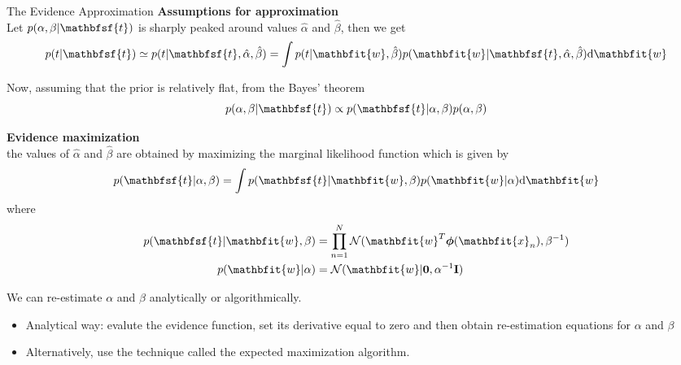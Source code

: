 \documentclass{bredelebeamer}
\begin{document}
\begin{frame}{The Evidence Approximation}
  \textbf{Assumptions for approximation} \\
  Let $p(\alpha, \beta | \mathbfsf{t})$ is sharply peaked around values
  $\hat{\alpha}$ and $\hat{\beta}$, then we get
  \begin{equation}
    p(t|\mathbfsf{t}) \simeq p(t|\mathbfsf{t},\hat{\alpha},\hat{\beta})
    = \int p(t|\mathbfit{w}, \hat{\beta}) p(\mathbfit{w}|\mathbfsf{t},\hat{\alpha},\hat{\beta}) \mathrm{d} \mathbfit{w}
  \end{equation}

  Now, assuming that the prior is relatively flat, from the Bayes' theorem
  \begin{equation}
    p(\alpha, \beta | \mathbfsf{t}) \propto p(\mathbfsf{t}|\alpha,\beta) p (\alpha, \beta)
  \end{equation}

  \textbf{Evidence maximization} \\
  the values of $\hat{\alpha}$ and $\hat{\beta}$ are obtained by maximizing the
  marginal likelihood function which is given by
  \begin{equation}
    p(\mathbfsf{t}|\alpha,\beta) = \int p(\mathbfsf{t}|\mathbfit{w},\beta) p(\mathbfit{w}|\alpha) \mathrm{d}\mathbfit{w}
  \end{equation}
  where
  \begin{equation}
    \begin{split}
      p(\mathbfsf{t}|\mathbfit{w},\beta) &= \prod_{n=1}^{N} \mathcal{N}(\mathbfit{w}^T \boldsymbol{\phi}(\mathbfit{x}_n), \beta^{-1}) \\
      p(\mathbfit{w}|\alpha) &= \mathcal{N}(\mathbfit{w} | \mathbf{0}, \alpha^{-1}\mathbf{I})
    \end{split}
  \end{equation}

  We can re-estimate $\alpha$ and $\beta$ analytically or algorithmically.
  \begin{itemize}
    \item Analytical way: evalute the evidence function, set its derivative equal
          to zero and then obtain re-estimation equations for $\alpha$ and $\beta$
    \item Alternatively, use the technique called the expected maximization
          algorithm.
  \end{itemize}
\end{frame}
\end{document}
